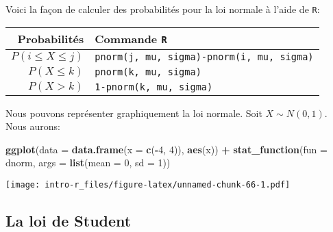 \documentclass[]{book}
\newenvironment{Shaded}{\begin{snugshade}}{\end{snugshade}}
\newcommand{\KeywordTok}[1]{\textcolor[rgb]{0.13,0.29,0.53}{\textbf{#1}}}
\newcommand{\DataTypeTok}[1]{\textcolor[rgb]{0.13,0.29,0.53}{#1}}
\newcommand{\DecValTok}[1]{\textcolor[rgb]{0.00,0.00,0.81}{#1}}
\newcommand{\StringTok}[1]{\textcolor[rgb]{0.31,0.60,0.02}{#1}}
\newcommand{\OperatorTok}[1]{\textcolor[rgb]{0.81,0.36,0.00}{\textbf{#1}}}
\newcommand{\NormalTok}[1]{#1}
\begin{document}
Voici la façon de calculer des probabilités pour la loi normale à l'aide
de \texttt{R}:

\begin{longtable}[]{@{}rl@{}}
\toprule
Probabilités & Commande \texttt{R}\tabularnewline
\midrule
\endhead
\(P(i\leq X \leq j)\) &
\texttt{pnorm(j,\ mu,\ sigma)-pnorm(i,\ mu,\ sigma)}\tabularnewline
\(P(X\leq k)\) & \texttt{pnorm(k,\ mu,\ sigma)}\tabularnewline
\(P(X>k)\) & \texttt{1-pnorm(k,\ mu,\ sigma)}\tabularnewline
\bottomrule
\end{longtable}

Nous pouvons représenter graphiquement la loi normale. Soit
\(X\sim N(0,1)\). Nous aurons:

\begin{Shaded}
\begin{Highlighting}[]
\KeywordTok{ggplot}\NormalTok{(}\DataTypeTok{data =} \KeywordTok{data.frame}\NormalTok{(}\DataTypeTok{x =} \KeywordTok{c}\NormalTok{(}\OperatorTok{-}\DecValTok{4}\NormalTok{, }\DecValTok{4}\NormalTok{)), }\KeywordTok{aes}\NormalTok{(x)) }\OperatorTok{+}
\StringTok{  }\KeywordTok{stat_function}\NormalTok{(}\DataTypeTok{fun =}\NormalTok{ dnorm, }\DataTypeTok{args =} \KeywordTok{list}\NormalTok{(}\DataTypeTok{mean =} \DecValTok{0}\NormalTok{, }\DataTypeTok{sd =} \DecValTok{1}\NormalTok{))}
\end{Highlighting}
\end{Shaded}

\texttt{[image: intro-r\_files/figure-latex/unnamed-chunk-66-1.pdf]}

\subsection{La loi de Student}\label{la-loi-de-student}


\end{document}

